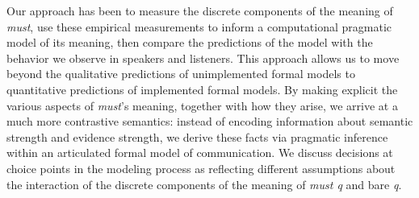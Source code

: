 \documentclass[11pt]{article}
\newcommand{\red}[1]{\textcolor{Red}{#1}}
\begin{document}
Our approach has been to measure the discrete components of the meaning of \emph{must}, use these empirical measurements to inform a computational pragmatic model of its meaning, then compare the predictions of the model with the behavior we observe in speakers and listeners. This approach allows us to move beyond the qualitative predictions of unimplemented formal models to quantitative predictions of implemented formal models. By making explicit the various aspects of \emph{must}'s meaning, together with how they arise, we arrive at a much more contrastive semantics: instead of encoding information about semantic strength and evidence strength, we derive these facts via pragmatic inference within an articulated formal model of communication. We discuss decisions at choice points in the modeling process as reflecting different assumptions about the interaction of the discrete components of the meaning of \emph{must q} and bare \emph{q}.


\vspace{-1em}
%
\small


\end{document}
